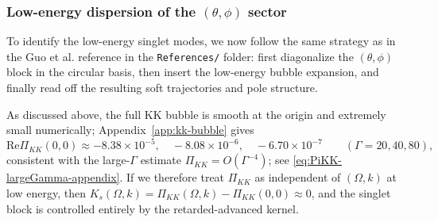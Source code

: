 \documentclass[aps,prx,preprint,amsmath,amssymb]{revtex4-2}
\renewcommand{\Re}{\text{Re}}
\begin{document}
\subsubsection{Low-energy dispersion of the \texorpdfstring{$(\theta,\phi)$}{(theta,phi)} sector}

To identify the low-energy singlet modes, we now follow the same strategy as in
the Guo et al. reference in the \texttt{References/} folder: first diagonalize the \((\theta,\phi)\) block in the
circular basis, then insert the low-energy bubble expansion, and finally read
off the resulting soft trajectories and pole structure.

As discussed above, the full KK bubble is smooth at the origin and extremely
small numerically; Appendix~\ref{app:kk-bubble} gives
\[
\Re \Pi_{KK}(0,0)
\approx
-8.38\times 10^{-5},\quad
-8.08\times 10^{-6},\quad
-6.70\times 10^{-7}
\qquad
(\Gamma=20,40,80),
\]
consistent with the large-\(\Gamma\) estimate
\(\Pi_{KK}=O(\Gamma^{-4})\); see \eqref{eq:PiKK-largeGamma-appendix}.  If we
therefore treat \(\Pi_{KK}\) as independent of \((\Omega,k)\) at low energy,
then \(K_s(\Omega,k)=\Pi_{KK}(\Omega,k)-\Pi_{KK}(0,0)\approx 0\), and the
singlet block is controlled entirely by the retarded-advanced kernel.
\end{document}
